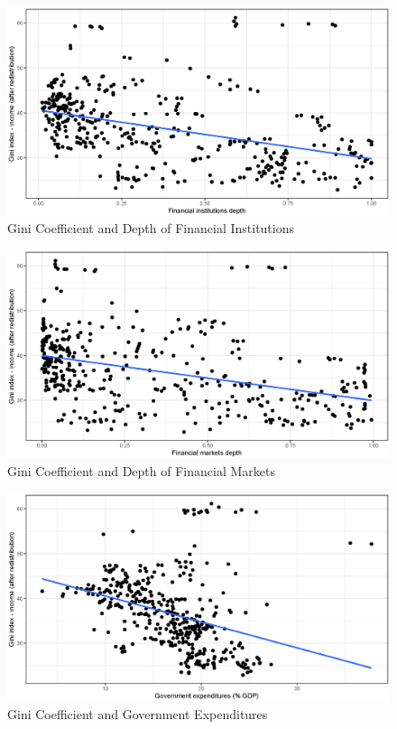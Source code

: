 \documentclass[a4paper,11pt]{article}
\begin{document}
\begin{figure}
    \caption{Gini Coefficient and Depth of Financial Institutions}
    \label{fig:ginifid}
\includegraphics[width=\textwidth, keepaspectratio]{figures/FIDGiniNet}
\end{figure}

\begin{figure}
    \caption{Gini Coefficient and Depth of Financial Markets}
    \label{fig:ginifmd}
\includegraphics[width=\textwidth, keepaspectratio]{figures/FMDGiniNet}
\end{figure}

\begin{figure}
    \caption{Gini Coefficient and Government Expenditures}
    \label{fig:ginigovexp}
\includegraphics[width=\textwidth, keepaspectratio]{figures/GovExpGiniNet}
\end{figure}
\end{document}
